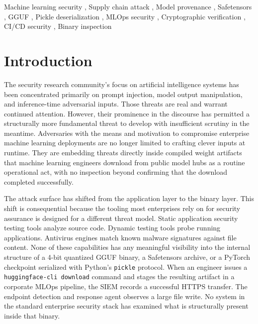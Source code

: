 \documentclass[preprint,12pt,twocolumn]{elsarticle}
\begin{document}
\begin{frontmatter}
\begin{keyword}
Machine learning security \sep
Supply chain attack \sep
Model provenance \sep
Safetensors \sep
GGUF \sep
Pickle deserialization \sep
MLOps security \sep
Cryptographic verification \sep
CI/CD security \sep
Binary inspection
\end{keyword}

\end{frontmatter}


\section{Introduction}
\label{sec:intro}

The security research community's focus on artificial intelligence systems
has been concentrated primarily on prompt injection, model output
manipulation, and inference-time adversarial inputs. Those threats are
real and warrant continued attention. However, their prominence in the
discourse has permitted a structurally more fundamental threat to develop
with insufficient scrutiny in the meantime. Adversaries with the means
and motivation to compromise enterprise machine learning deployments are no
longer limited to crafting clever inputs at runtime. They are embedding
threats directly inside compiled weight artifacts that machine learning
engineers download from public model hubs as a routine operational act,
with no inspection beyond confirming that the download completed
successfully.

The attack surface has shifted from the application layer to the binary
layer. This shift is consequential because the tooling most enterprises
rely on for security assurance is designed for a different threat model.
Static application security testing tools analyze source code. Dynamic
testing tools probe running applications. Antivirus engines match known
malware signatures against file content. None of these capabilities has
any meaningful visibility into the internal structure of a 4-bit quantized
GGUF binary, a Safetensors archive, or a PyTorch checkpoint serialized
with Python's \texttt{pickle} protocol. When an engineer issues a
\texttt{huggingface-cli download} command and stages the resulting artifact
in a corporate MLOps pipeline, the SIEM records a successful HTTPS transfer.
The endpoint detection and response agent observes a large file write. No
system in the standard enterprise security stack has examined what is
structurally present inside that binary.
\end{document}

